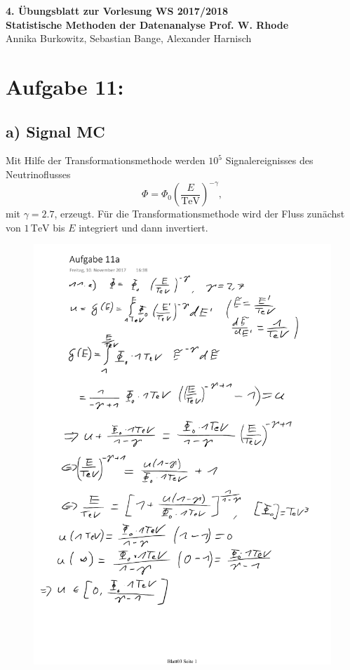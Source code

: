 \documentclass[a4paper, 11pt]{article}
\begin{document}
\noindent
\large{\textbf{4. Übungsblatt zur Vorlesung \hfill WS 2017/2018 \\
Statistische Methoden der Datenanalyse \hfill Prof. W. Rhode}} \\
Annika Burkowitz, Sebastian Bange, Alexander Harnisch \\
\noindent\makebox[\linewidth]{\rule{\textwidth}{0.4pt}}

\section*{Aufgabe 11: }
\subsection*{a) Signal MC}
Mit Hilfe der Transformationsmethode werden $10^5$ Signalereignisses des
Neutrinoflusses
\begin{equation}
  \Phi = \Phi_0 \left(\frac{E}{\text{TeV}}\right)^{-\gamma},
\end{equation}
mit $\gamma = 2.7$, erzeugt. Für die Transformationsmethode wird der Fluss zunächst
von $1\,\text{TeV}$ bis $E$ integriert und dann invertiert.
\begin{figure}
  \centering
  \includegraphics[width=\textwidth]{../A11/Rechnung.pdf}
\end{figure}
\end{document}
